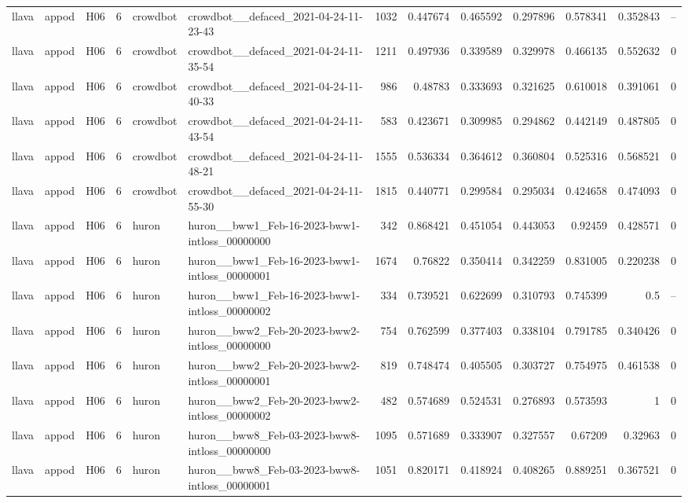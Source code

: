 \begin{longtable}{lllrllrrrrrrr}
llava & appod & H06 & 6 & crowdbot & crowdbot\_\_defaced\_2021-04-24-11-23-43 & 1032 & 0.447674 & 0.465592 & 0.297896 & 0.578341 & 0.352843 & -- \\
llava & appod & H06 & 6 & crowdbot & crowdbot\_\_defaced\_2021-04-24-11-35-54 & 1211 & 0.497936 & 0.339589 & 0.329978 & 0.466135 & 0.552632 & 0 \\
llava & appod & H06 & 6 & crowdbot & crowdbot\_\_defaced\_2021-04-24-11-40-33 & 986 & 0.48783 & 0.333693 & 0.321625 & 0.610018 & 0.391061 & 0 \\
llava & appod & H06 & 6 & crowdbot & crowdbot\_\_defaced\_2021-04-24-11-43-54 & 583 & 0.423671 & 0.309985 & 0.294862 & 0.442149 & 0.487805 & 0 \\
llava & appod & H06 & 6 & crowdbot & crowdbot\_\_defaced\_2021-04-24-11-48-21 & 1555 & 0.536334 & 0.364612 & 0.360804 & 0.525316 & 0.568521 & 0 \\
llava & appod & H06 & 6 & crowdbot & crowdbot\_\_defaced\_2021-04-24-11-55-30 & 1815 & 0.440771 & 0.299584 & 0.295034 & 0.424658 & 0.474093 & 0 \\
llava & appod & H06 & 6 & huron & huron\_\_bww1\_Feb-16-2023-bww1-intloss\_00000000 & 342 & 0.868421 & 0.451054 & 0.443053 & 0.92459 & 0.428571 & 0 \\
llava & appod & H06 & 6 & huron & huron\_\_bww1\_Feb-16-2023-bww1-intloss\_00000001 & 1674 & 0.76822 & 0.350414 & 0.342259 & 0.831005 & 0.220238 & 0 \\
llava & appod & H06 & 6 & huron & huron\_\_bww1\_Feb-16-2023-bww1-intloss\_00000002 & 334 & 0.739521 & 0.622699 & 0.310793 & 0.745399 & 0.5 & -- \\
llava & appod & H06 & 6 & huron & huron\_\_bww2\_Feb-20-2023-bww2-intloss\_00000000 & 754 & 0.762599 & 0.377403 & 0.338104 & 0.791785 & 0.340426 & 0 \\
llava & appod & H06 & 6 & huron & huron\_\_bww2\_Feb-20-2023-bww2-intloss\_00000001 & 819 & 0.748474 & 0.405505 & 0.303727 & 0.754975 & 0.461538 & 0 \\
llava & appod & H06 & 6 & huron & huron\_\_bww2\_Feb-20-2023-bww2-intloss\_00000002 & 482 & 0.574689 & 0.524531 & 0.276893 & 0.573593 & 1 & 0 \\
llava & appod & H06 & 6 & huron & huron\_\_bww8\_Feb-03-2023-bww8-intloss\_00000000 & 1095 & 0.571689 & 0.333907 & 0.327557 & 0.67209 & 0.32963 & 0 \\
llava & appod & H06 & 6 & huron & huron\_\_bww8\_Feb-03-2023-bww8-intloss\_00000001 & 1051 & 0.820171 & 0.418924 & 0.408265 & 0.889251 & 0.367521 & 0 \\

\end{longtable}
